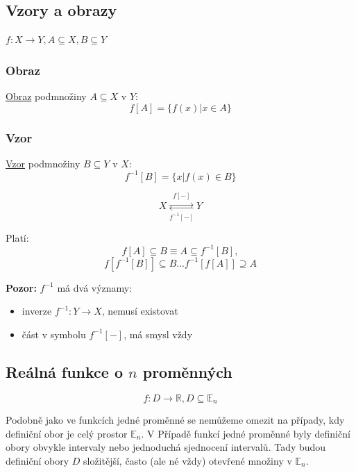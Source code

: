 \documentclass[10pt]{article}
\begin{document}
\subsection{Vzory a obrazy}
\hspace{1.2mm}
$f: X \rightarrow Y, A \subseteq X, B \subseteq Y$
\noindent
\subsubsection{Obraz}
\hspace{1.2mm}
\underline{Obraz} podmnožiny $A\subseteq X$ v $Y$:
\[f[A] = \{f(x) | x \in A\}\]
\noindent

\subsubsection{Vzor}
\hspace{1.2mm}
\underline{Vzor} podmnožiny $B\subseteq Y$ v $X$:
\[f^{-1}[B] = \{x | f(x) \in B\}\]

\[X \underset{f^{-1}[-]}{\stackrel{f[-]}{\rightleftarrows}} Y\]

Platí:
\[f[A] \subseteq B \equiv A \subseteq f^{-1}[B],\]
\[f[f^{-1}[B]] \subseteq B  ...  f^{-1}[f[A]] \supseteq A\]


\textbf{Pozor:} $f^{-1}$ má dvá významy:
\begin{itemize}
    \item inverze $f^{-1}:Y \rightarrow X$, nemusí existovat
    \item část v symbolu $f^{-1}[-]$, má smysl vždy
 
\end{itemize}
\noindent

\subsection{Reálná funkce o $n$ proměnných}
\hspace{1.2mm}
\[f: D \rightarrow \mathbb{R}, D \subseteq \mathbb{E}_n\]

Podobně jako ve funkcích jedné proměnné se nemůžeme omezit na případy, kdy definiční obor je celý prostor $\mathbb{E}_n$. V 
Případě funkcí jedné proměnné byly definiční obory obvykle intervaly nebo jednoduchá sjednocení intervalů. Tady budou definiční
obory $D$ složitější, často (ale né vždy) otevřené množiny v $\mathbb{E}_n$.
\end{document}
